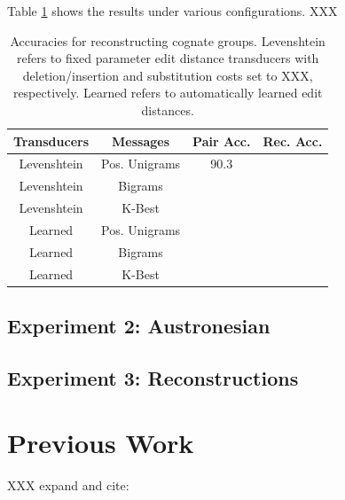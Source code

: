 \documentclass[11pt,a4paper]{article}
\begin{document}
Table \ref{tbl:exp1} shows the results under various configurations. XXX

\begin{table}
  \begin{tabular}{|c|c|c|c|}
    Transducers & Messages & Pair Acc. & Rec. Acc.\\
    \hline
    \hline
    Levenshtein&Pos. Unigrams & 90.3 & \\
    Levenshtein&Bigrams & & \\
    Levenshtein&K-Best & & \\
    \hline
    Learned&Pos. Unigrams & & \\
    Learned&Bigrams & & \\
    Learned&K-Best & & \\
  \end{tabular}
  \caption{Accuracies for reconstructing cognate groups. Levenshtein
  refers to fixed parameter edit distance transducers with
  deletion/insertion and substitution costs set to XXX, respectively.
  Learned refers to automatically learned edit distances.}
  \label{tbl:exp1}
\end{table}

\subsection{Experiment 2: Austronesian}

\subsection{Experiment 3: Reconstructions}


\section{Previous Work}
XXX expand and cite:
\end{document}
